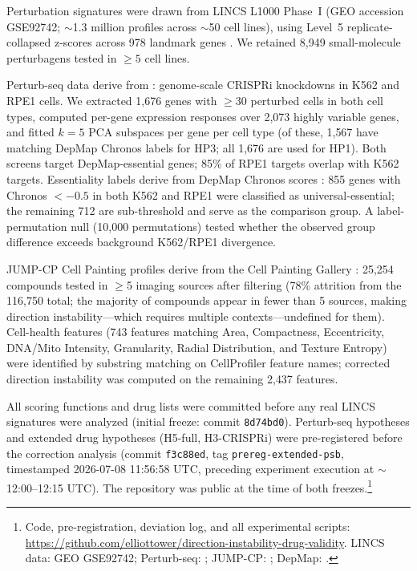 \documentclass[11pt]{article}
\begin{document}
Perturbation signatures were drawn from LINCS L1000 Phase~I (GEO accession
GSE92742; $\sim$1.3 million profiles across $\sim$50 cell lines),
using Level~5 replicate-collapsed z-scores across 978 landmark genes
\citep{subramanian2017next}. We retained 8{,}949 small-molecule
perturbagens tested in $\geq5$ cell lines.

Perturb-seq data derive from \citet{replogle2022mapping}: genome-scale
CRISPRi knockdowns in K562 and RPE1 cells. We extracted 1{,}676 genes
with $\geq$30 perturbed cells in both cell types, computed per-gene
expression responses over 2{,}073 highly variable genes, and fitted
$k = 5$ PCA subspaces per gene per cell type (of these, 1{,}567 have
matching DepMap Chronos labels for HP3; all 1{,}676 are used for HP1).
Both screens target DepMap-essential genes; 85\% of RPE1 targets overlap
with K562 targets. Essentiality labels derive from DepMap Chronos scores
\citep{dempster2021chronos}: 855 genes with Chronos $< -0.5$ in both
K562 and RPE1 were classified as universal-essential; the remaining 712
are sub-threshold and serve as the comparison group. A label-permutation
null (10{,}000 permutations) tested whether the observed group difference
exceeds background K562/RPE1 divergence.

JUMP-CP Cell Painting profiles derive from the Cell Painting Gallery
\citep{chandrasekaran2023jump}: 25{,}254 compounds tested in $\geq$5
imaging sources after filtering (78\% attrition from the 116{,}750
total; the majority of compounds appear in fewer than 5 sources,
making direction instability---which requires multiple
contexts---undefined for them). Cell-health features (743 features matching Area,
Compactness, Eccentricity, DNA/Mito Intensity, Granularity, Radial
Distribution, and Texture Entropy) were identified by substring matching
on CellProfiler feature names; corrected direction instability was computed
on the remaining 2{,}437 features.

All scoring functions and drug lists were committed before any real LINCS
signatures were analyzed (initial freeze: commit \texttt{8d74bd0}).
Perturb-seq hypotheses and extended drug hypotheses (H5-full,
H3-CRISPRi) were pre-registered before the correction analysis
(commit \texttt{f3c88ed}, tag \texttt{prereg-extended-psb}, timestamped
2026-07-08 11:56:58 UTC, preceding experiment execution at
${\sim}$12:00--12:15 UTC). The repository was public at the time of both
freezes.\footnote{Code, pre-registration, deviation log, and all
experimental scripts:
\url{https://github.com/elliottower/direction-instability-drug-validity}.
LINCS data: GEO GSE92742; Perturb-seq: \citet{replogle2022mapping};
JUMP-CP: \citet{chandrasekaran2023jump}; DepMap: \citet{dempster2021chronos}.}
\end{document}
